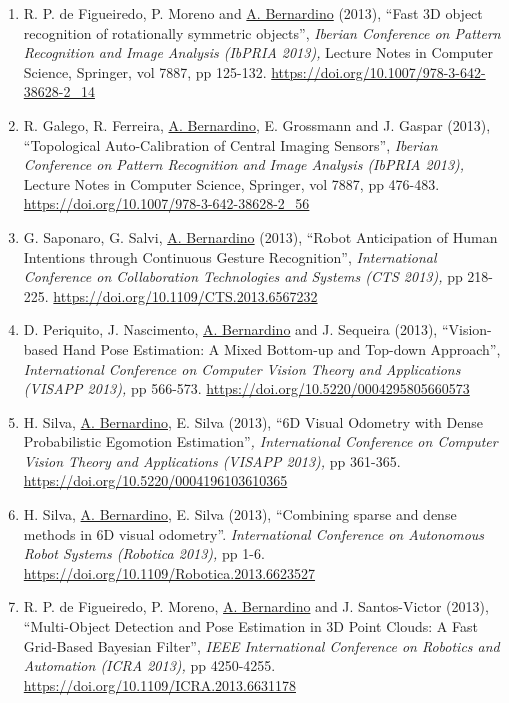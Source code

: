 \begin{enumerate}
{  (IbPRIA 2013),} Lecture Notes in Computer Science, Springer, vol 7887,
  pp 286-295. \url{https://doi.org/10.1007/978-3-642-38628-2_34}~
\item
  R. P. de Figueiredo, P. Moreno and \ul{A. Bernardino} (2013), ``Fast
  3D object recognition of rotationally symmetric objects'',
  \emph{Iberian Conference on Pattern Recognition and Image Analysis
  (IbPRIA 2013),} Lecture Notes in Computer Science, Springer, vol 7887,
  pp 125-132. \url{https://doi.org/10.1007/978-3-642-38628-2_14}~
\item
  R. Galego, R. Ferreira, \ul{A. Bernardino}, E. Grossmann and J. Gaspar
  (2013), ``Topological Auto-Calibration of Central Imaging Sensors'',
  \emph{Iberian Conference on Pattern Recognition and Image Analysis
  (IbPRIA 2013),} Lecture Notes in Computer Science, Springer, vol 7887,
  pp 476-483. \url{https://doi.org/10.1007/978-3-642-38628-2_56}~
\item
  G. Saponaro, G. Salvi, \ul{A. Bernardino} (2013), ``Robot Anticipation
  of Human Intentions through Continuous Gesture Recognition'',
  \emph{International Conference on Collaboration Technologies and
  Systems (CTS 2013),} pp 218-225.
  \url{https://doi.org/10.1109/CTS.2013.6567232}~
\item
  D. Periquito, J. Nascimento, \ul{A. Bernardino} and J. Sequeira
  (2013), ``Vision-based Hand Pose Estimation: A Mixed Bottom-up and
  Top-down Approach'', \emph{International Conference on Computer Vision
  Theory and Applications (VISAPP 2013),} pp 566-573.
  \url{https://doi.org/10.5220/0004295805660573}~
\item
  H. Silva, \ul{A. Bernardino}, E. Silva (2013), ``6D Visual Odometry
  with Dense Probabilistic Egomotion Estimation''\emph{, International
  Conference on Computer Vision Theory and Applications (VISAPP 2013),}
  pp 361-365. \url{https://doi.org/10.5220/0004196103610365}~
\item
  H. Silva, \ul{A. Bernardino}, E. Silva (2013), ``Combining sparse and
  dense methods in 6D visual odometry''. \emph{International Conference
  on Autonomous Robot Systems (Robotica 2013),} pp 1-6.
  \url{https://doi.org/10.1109/Robotica.2013.6623527}~
\item
  R. P. de Figueiredo, P. Moreno, \ul{A. Bernardino} and J.
  Santos-Victor (2013), ``Multi-Object Detection and Pose Estimation in
  3D Point Clouds: A Fast Grid-Based Bayesian Filter'', \emph{IEEE
  International Conference on Robotics and Automation (ICRA 2013),} pp
  4250-4255. \url{https://doi.org/10.1109/ICRA.2013.6631178}~~~

\end{enumerate}
